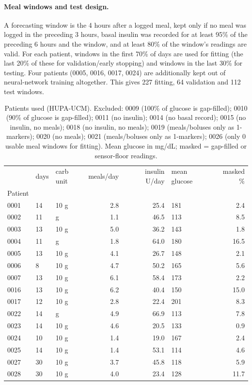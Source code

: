 \documentclass[11pt,a4paper]{article}
\begin{document}
\paragraph{Meal windows and test design.} A forecasting window is the 4 hours after a logged meal, kept only if no meal was logged in the preceding 3 hours, basal insulin was recorded for at least 95\% of the preceding 6 hours and the window, and at least 80\% of the window's readings are valid. For each patient, windows in the first 70\% of days are used for fitting (the last 20\% of these for validation/early stopping) and windows in the last 30\% for testing. Four patients (0005, 0016, 0017, 0024) are additionally kept out of neural-network training altogether. This gives 227 fitting, 64 validation and 112 test windows.

\begin{table}[H]
\centering
\caption{Patients used (HUPA-UCM). Excluded: 0009 (100\% of glucose is gap-filled); 0010 (90\% of glucose is gap-filled); 0011 (no insulin); 0014 (no basal record); 0015 (no insulin, no meals); 0018 (no insulin, no meals); 0019 (meals/boluses only as 1-markers); 0020 (no meals); 0021 (meals/boluses only as 1-markers); 0026 (only 0 usable meal windows for fitting). Mean glucose in mg/dL; masked = gap-filled or sensor-floor readings.}
\label{tab:cohort}
\small
\begin{tabular}{lllrrlr}
\toprule
 & days & carb unit & meals/day & insulin U/day & mean glucose & masked \% \\
Patient &  &  &  &  &  &  \\
\midrule
0001 & 14 & 10 g & 2.8 & 25.4 & 181 & 2.4 \\
0002 & 11 & g & 1.1 & 46.5 & 113 & 8.5 \\
0003 & 13 & 10 g & 5.0 & 36.2 & 143 & 1.8 \\
0004 & 11 & g & 1.8 & 64.0 & 180 & 16.5 \\
0005 & 13 & 10 g & 4.1 & 26.7 & 148 & 2.1 \\
0006 & 8 & 10 g & 4.7 & 50.2 & 165 & 5.6 \\
0007 & 13 & 10 g & 6.1 & 58.4 & 173 & 2.2 \\
0016 & 13 & 10 g & 6.2 & 40.4 & 150 & 15.0 \\
0017 & 12 & 10 g & 2.8 & 22.4 & 201 & 8.3 \\
0022 & 14 & g & 4.9 & 66.9 & 113 & 7.8 \\
0023 & 14 & 10 g & 4.6 & 20.5 & 133 & 0.9 \\
0024 & 10 & 10 g & 1.4 & 19.0 & 167 & 2.4 \\
0025 & 14 & 10 g & 1.4 & 53.1 & 114 & 4.6 \\
0027 & 30 & 10 g & 3.7 & 45.8 & 118 & 5.9 \\
0028 & 30 & 10 g & 4.0 & 23.4 & 128 & 11.7 \\
\bottomrule
\end{tabular}
\end{table}
\end{document}
